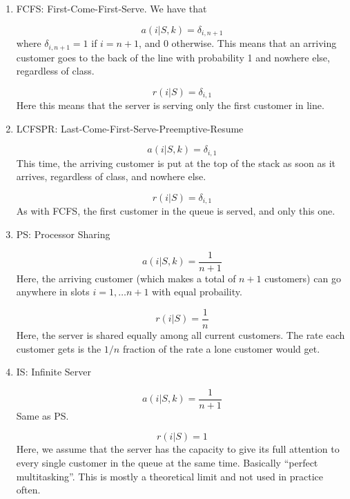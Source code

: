 \documentclass[12pt,titlepage]{article}
\theoremstyle{plain}
\theoremstyle{definition}
\theoremstyle{remark}
\begin{document}
\begin{enumerate}%
\item FCFS: First-Come-First-Serve. We have that

\begin{displaymath}
a(i|S,k) = \delta_{i,n+1}
\end{displaymath}
where $\delta_{i,n+1} = 1$ if $i=n+1$, and 0 otherwise. This means that an arriving customer goes to the back of the line with probability 1 and nowhere else, regardless of class.

\begin{displaymath}
r(i|S) = \delta_{i,1}
\end{displaymath}
Here this means that the server is serving only the first customer in line.


\item LCFSPR: Last-Come-First-Serve-Preemptive-Resume

\begin{displaymath}
a(i|S,k) = \delta_{i,1}
\end{displaymath}
This time, the arriving customer is put at the top of the stack as soon as it arrives, regardless of class, and nowhere else.

\begin{displaymath}
r(i|S) = \delta_{i,1}
\end{displaymath}
As with FCFS, the first customer in the queue is served, and only this one.


\item PS: Processor Sharing

\begin{displaymath}
a(i|S,k) = \frac{1}{n+1}
\end{displaymath}
Here, the arriving customer (which makes a total of $n+1$ customers) can go anywhere in slots $i=1,\ldots n+1$ with equal probaility.

\begin{displaymath}
r(i|S) = \frac{1}{n}
\end{displaymath}
Here, the server is shared equally among all current customers. The rate each customer gets is the $1/n$ fraction of the rate a lone customer would get.


\item IS: Infinite Server

\begin{displaymath}
a(i|S,k) = \frac{1}{n+1}
\end{displaymath}
Same as PS.

\begin{displaymath}
r(i|S) = 1
\end{displaymath}
Here, we assume that the server has the capacity to give its full attention to every single customer in the queue at the same time. Basically ``perfect multitasking''. This is mostly a theoretical limit and not used in practice often.



\end{enumerate}
\end{document}
